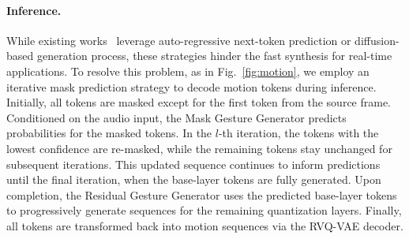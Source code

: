 \paragraph{Inference.} While existing works~\cite{liu2023emage, yi2022generating, diffsheg} leverage auto-regressive next-token prediction or diffusion-based generation process, these strategies hinder the fast synthesis for real-time applications. To resolve this problem, as in Fig.~\ref{fig:motion}, we employ an iterative mask prediction strategy to decode motion tokens during inference. Initially, all tokens are masked except for the first token from the source frame. Conditioned on the audio input, the Mask Gesture Generator predicts probabilities for the masked tokens. In the \( l \)-th iteration, the tokens with the lowest confidence are re-masked, while the remaining tokens stay unchanged for subsequent iterations. This updated sequence continues to inform predictions until the final iteration, when the base-layer tokens are fully generated. Upon completion, the Residual Gesture Generator uses the predicted base-layer tokens to progressively generate sequences for the remaining quantization layers. Finally, all tokens are transformed back into motion sequences via the RVQ-VAE decoder.

